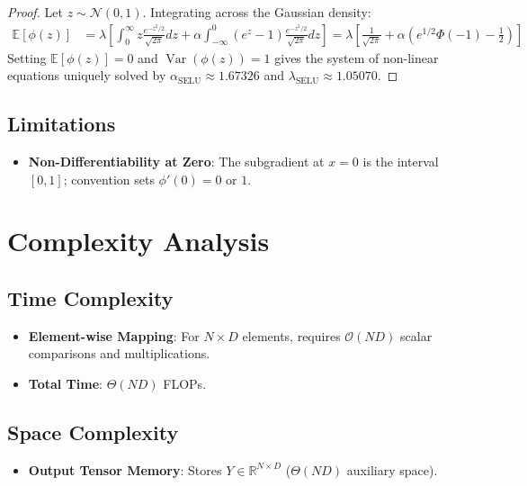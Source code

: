 \documentclass[11pt,a4paper]{article}
\theoremstyle{definition}
\begin{document}
\begin{proof}
Let $z \sim \mathcal{N}(0, 1)$. Integrating across the Gaussian density:
\begin{align}
\mathbb{E}[\phi(z)] &= \lambda \left[ \int_0^\infty z \frac{e^{-z^2/2}}{\sqrt{2\pi}} dz + \alpha \int_{-\infty}^0 (e^z - 1) \frac{e^{-z^2/2}}{\sqrt{2\pi}} dz \right] = \lambda \left[ \frac{1}{\sqrt{2\pi}} + \alpha \left( e^{1/2} \Phi(-1) - \frac{1}{2} \right) \right]
\end{align}
Setting $\mathbb{E}[\phi(z)] = 0$ and $\operatorname{Var}(\phi(z)) = 1$ gives the system of non-linear equations uniquely solved by $\alpha_{\text{SELU}} \approx 1.67326$ and $\lambda_{\text{SELU}} \approx 1.05070$.
\end{proof}

\subsection{Limitations}
\begin{itemize}
    \item \textbf{Non-Differentiability at Zero}: The subgradient at $x = 0$ is the interval $[0, 1]$; convention sets $\phi'(0) = 0$ or $1$.
\end{itemize}

\section{Complexity Analysis}

\subsection{Time Complexity}
\begin{itemize}
    \item \textbf{Element-wise Mapping}: For $N \times D$ elements, requires $\mathcal{O}(ND)$ scalar comparisons and multiplications.
    \item \textbf{Total Time}: $\Theta(ND)$ FLOPs.
\end{itemize}

\subsection{Space Complexity}
\begin{itemize}
    \item \textbf{Output Tensor Memory}: Stores $Y \in \mathbb{R}^{N \times D}$ ($\Theta(ND)$ auxiliary space).
\end{itemize}
\end{document}
